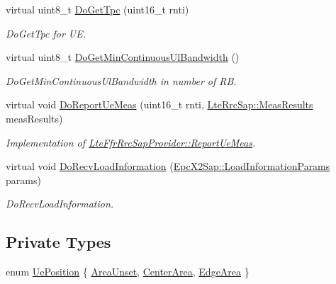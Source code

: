 \begin{DoxyCompactItemize}
virtual uint8\+\_\+t \hyperlink{classns3_1_1LteFfrEnhancedAlgorithm_a4d9a0d4bc823717148985915cee0c48f}{Do\+Get\+Tpc} (uint16\+\_\+t rnti)
\begin{DoxyCompactList}\small\item\em Do\+Get\+Tpc for UE. \end{DoxyCompactList}\item 
virtual uint8\+\_\+t \hyperlink{classns3_1_1LteFfrEnhancedAlgorithm_aa66da4710bf1c076effc056d6160fc3c}{Do\+Get\+Min\+Continuous\+Ul\+Bandwidth} ()
\begin{DoxyCompactList}\small\item\em Do\+Get\+Min\+Continuous\+Ul\+Bandwidth in number of RB. \end{DoxyCompactList}\item 
virtual void \hyperlink{classns3_1_1LteFfrEnhancedAlgorithm_aa6e396be06520a9b56418c3ad850fd42}{Do\+Report\+Ue\+Meas} (uint16\+\_\+t rnti, \hyperlink{structns3_1_1LteRrcSap_1_1MeasResults}{Lte\+Rrc\+Sap\+::\+Meas\+Results} meas\+Results)
\begin{DoxyCompactList}\small\item\em Implementation of \hyperlink{classns3_1_1LteFfrRrcSapProvider_aefa0779641b8432a7d3406b519ca7e59}{Lte\+Ffr\+Rrc\+Sap\+Provider\+::\+Report\+Ue\+Meas}. \end{DoxyCompactList}\item 
virtual void \hyperlink{classns3_1_1LteFfrEnhancedAlgorithm_a86617fe6c008ce7814c709d72d84ebd2}{Do\+Recv\+Load\+Information} (\hyperlink{structns3_1_1EpcX2Sap_1_1LoadInformationParams}{Epc\+X2\+Sap\+::\+Load\+Information\+Params} params)
\begin{DoxyCompactList}\small\item\em Do\+Recv\+Load\+Information. \end{DoxyCompactList}\end{DoxyCompactItemize}
\subsection*{Private Types}
\begin{DoxyCompactItemize}
\item 
enum \hyperlink{classns3_1_1LteFfrEnhancedAlgorithm_a743d5d1934dc49e7c88a2850f624e6c3}{Ue\+Position} \{ \hyperlink{classns3_1_1LteFfrEnhancedAlgorithm_a743d5d1934dc49e7c88a2850f624e6c3ad8d4a3dcc89aa9fe95bcb7349e8f06dc}{Area\+Unset}, 
\hyperlink{classns3_1_1LteFfrEnhancedAlgorithm_a743d5d1934dc49e7c88a2850f624e6c3a8bd1f2ad88e188ffceddb4860dbcf519}{Center\+Area}, 
\hyperlink{classns3_1_1LteFfrEnhancedAlgorithm_a743d5d1934dc49e7c88a2850f624e6c3a2cb214dc1035d1d17b954464601f7a3e}{Edge\+Area}
 \}
\end{DoxyCompactItemize}
